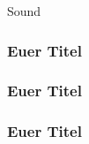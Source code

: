 \begin{frame}
	\begin{center}
		\Huge Sound
	\end{center}
\end{frame}

\begin{frame}
	\frametitle{Euer Titel}
\end{frame}

\begin{frame}
	\frametitle{Euer Titel}
\end{frame}

\begin{frame}
	\frametitle{Euer Titel}
\end{frame}